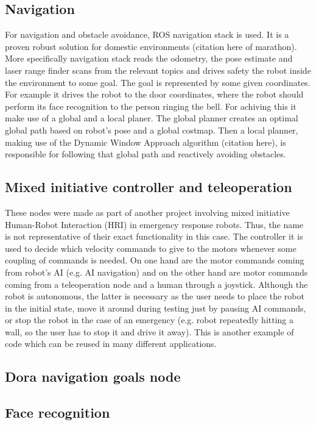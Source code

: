 \documentclass[conference]{IEEEtran}
\begin{document}
\subsection{Navigation}
For navigation and obstacle avoidance, ROS navigation stack is used. It is a proven robust solution for domestic environments (citation here of marathon). More specifically navigation stack reads the odometry, the pose estimate and laser range finder scans from the relevant topics and drives safety the robot inside the environment to some goal. The goal is represented by some given coordinates. For example it drives the robot to the door coordinates, where the robot should perform its face recognition to the person ringing the bell. For achiving this it make use of a global and a local planer. The global planner creates an optimal global path based on robot's pose and a global costmap. Then a local planner, making use of the Dynamic Window Approach algorithm (citation here), is responsible for following that global path and reactively avoiding obstacles.

\subsection{Mixed initiative controller and teleoperation}
These nodes were made as part of another project involving mixed initiative Human-Robot Interaction (HRI) in emergency response robots. Thus, the name is not representative of their exact functionality in this case. The controller it is used to decide which velocity commands to give to the motors whenever some coupling of commands is needed. On one hand are the motor commands coming from robot's AI (e.g. AI navigation) and on the other hand are motor commands coming from a teleoperation node and a human through a joystick. Although the robot is autonomous, the latter is necessary as the user needs to place the robot in the initial state, move it around during testing just by pausing AI commands, or stop the robot in the case of an emergency (e.g. robot repeatedly hitting a wall, so the user has to stop it and drive it away).  This is another example of code which can be reused in many different applications.

\subsection{Dora navigation goals node}
\subsection{Face recognition}
\end{document}
